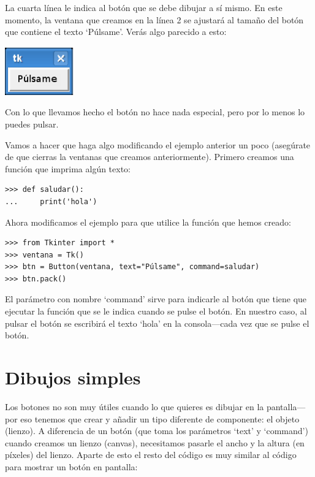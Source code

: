 La cuarta línea le indica al botón que se debe dibujar a sí mismo. En este momento, la ventana que creamos en la línea 2 se ajustará al tamaño del botón que contiene el texto `Púlsame'. Verás algo parecido a esto: 

\begin{center}
\includegraphics*[width=30mm]{figure31.eps}
\end{center}

Con lo que llevamos hecho el botón no hace nada especial, pero por lo menos lo puedes pulsar.

Vamos a hacer que haga algo modificando el ejemplo anterior un poco (asegúrate de que cierras la ventanas que creamos anteriormente). Primero creamos una función que imprima algún texto:

\begin{listing}
\begin{verbatim}
>>> def saludar():
...     print('hola')
\end{verbatim}
\end{listing}

\noindent
Ahora modificamos el ejemplo para que utilice la función que hemos creado:

\begin{listing}
\begin{verbatim}
>>> from Tkinter import *
>>> ventana = Tk()
>>> btn = Button(ventana, text="Púlsame", command=saludar)
>>> btn.pack()
\end{verbatim}
\end{listing}

El parámetro con nombre `command' sirve para indicarle al botón que tiene que ejecutar la función que se le indica cuando se pulse el botón. En nuestro caso, al pulsar el botón se escribirá el texto `hola' en la consola---cada vez que se pulse el botón. 

\section{Dibujos simples}

Los botones no son muy útiles cuando lo que quieres es dibujar en la pantalla---por eso tenemos que crear y añadir un tipo diferente de componente: el objeto (lienzo). A diferencia de un botón (que toma los parámetros `text' y `command') cuando creamos un lienzo (canvas), necesitamos pasarle el ancho y la altura (en píxeles) del lienzo.  Aparte de esto el resto del código es muy similar al código para mostrar un botón en pantalla:

